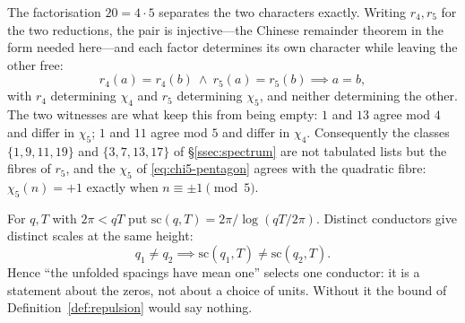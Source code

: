\begin{proposition}\label{prop:attribution}
The factorisation $20=4\cdot5$ separates the two characters exactly. Writing $r_4,r_5$ for the two
reductions, the pair is injective---the Chinese remainder theorem in the form needed here---and
each factor determines its own character while leaving the other free:
\begin{equation}\label{eq:attribution}
  r_4(a)=r_4(b)\ \wedge\ r_5(a)=r_5(b)\implies a=b,
\end{equation}
with $r_4$ determining $\chi_4$ and $r_5$ determining $\chi_5$, and neither determining the other.
The two witnesses are what keep this from being empty: $1$ and $13$ agree mod $4$ and differ in
$\chi_5$; $1$ and $11$ agree mod $5$ and differ in $\chi_4$. Consequently the classes
$\{1,9,11,19\}$ and $\{3,7,13,17\}$ of \S\ref{ssec:spectrum} are not tabulated lists but the fibres
of $r_5$, and the $\chi_5$ of \eqref{eq:chi5-pentagon} agrees with the quadratic fibre:
$\chi_5(n)=+1$ exactly when $n\equiv\pm1\pmod5$.

\end{proposition}

\begin{proposition}\label{prop:scale}
For $q,T$ with $2\pi<qT$ put $\mathrm{sc}(q,T)=2\pi/\log(qT/2\pi)$. Distinct conductors give
distinct scales at the same height:
\begin{equation}\label{eq:scale-injective}
  q_1\neq q_2 \implies \mathrm{sc}(q_1,T)\neq \mathrm{sc}(q_2,T).
\end{equation}
Hence ``the unfolded spacings have mean one'' selects one conductor: it is a statement about the
zeros, not about a choice of units. Without it the bound of
Definition~\ref{def:repulsion} would say nothing.

\end{proposition}

